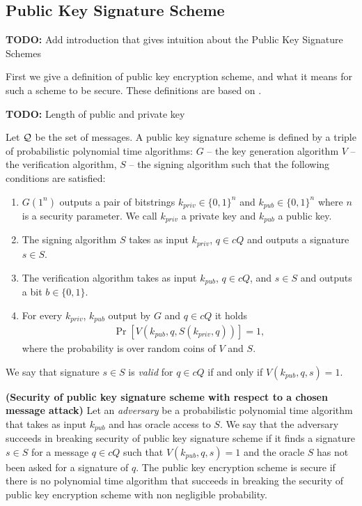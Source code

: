 \documentclass[11pt,a4paper,titlepage]{memoir}
\begin{document}
\subsection{Public Key Signature Scheme}
\begin{todo}
  \textbf{TODO:} Add introduction that gives intuition about the Public Key Signature Schemes
\end{todo}

First we give a definition of public key encryption scheme, and what it means for such a scheme to be secure.
These definitions are based on \cite{Goldreich:2004:FCV:975541}.

\begin{todo}
  \textbf{TODO:} Length of public and private key
\end{todo}

\begin{definition}
Let $\mathcal{Q}$ be the set of messages. A \textnormal{public key signature scheme} is defined by a triple of probabilistic polynomial time algorithms:
$G$ -- the key generation algorithm
$V$ -- the verification algorithm,
$S$ -- the signing algorithm
such that the following conditions are satisfied:
\begin{enumerate}[-]
  \item $G(1^n)$ outputs a pair of bitstrings $k_{priv} \in \{0,1\}^{n}$ and $k_{pub} \in \{0,1\}^{n}$ where $n$ is a security parameter.
    We call $k_{priv}$ a private key and $k_{pub}$ a public key.
  \item The signing algorithm $S$ takes as input $k_{priv}$, $q \in cQ$ and outputs a signature $s \in S$.
  \item The verification algorithm takes as input $k_{pub}$, $q \in cQ$, and $s \in S$ and outputs a bit $b \in \{0,1\}$.
  \item For every $k_{priv}$, $k_{pub}$ output by $G$ and $q \in cQ$ it holds
    \begin{align*}
      \Pr[V(k_{pub}, q, S(k_{priv}, q))] = 1,
    \end{align*}
    where the probability is over random coins of $V$ and $S$.
\end{enumerate}
\end{definition}
We say that signature $s \in S$ is \textit{valid} for $q \in cQ$ if and only if $V(k_{pub}, q, s) = 1$.
%
%
\begin{definition}\textbf{(Security of public key signature scheme with respect to a chosen message attack)}
Let an \textit{adversary} be a probabilistic polynomial time algorithm that takes as input $k_{pub}$ and has oracle access to $S$.
We say that the adversary \textnormal{succeeds in breaking security of public key signature scheme}
if it finds a signature $s \in S$ for a message $q \in cQ$ such that $V(k_{pub}, q, s) = 1$
and the oracle $S$ has not been asked for a signature of $q$.
The public key encryption scheme is \textnormal{secure} if there is no polynomial time algorithm that succeeds in breaking the
security of public key encryption scheme with non negligible probability.
\end{definition}
\end{document}
